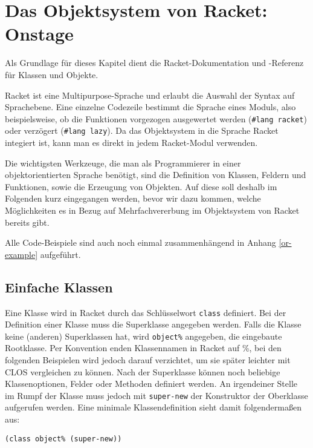 \section{Das Objektsystem von Racket: Onstage}
Als Grundlage für dieses Kapitel dient die Racket-Dokumentation\cite{racketguide-classes} und -Referenz\cite{racketref-classes} für Klassen und Objekte.

Racket ist eine Multipurpose-Sprache und erlaubt die Auswahl der Syntax auf Sprachebene. Eine einzelne Codezeile bestimmt die Sprache eines Moduls, also beispielsweise, ob die Funktionen vorgezogen ausgewertet werden (\texttt{\#lang racket}) oder verzögert (\texttt{\#lang lazy}). Da das Objektsystem in die Sprache Racket integiert ist, kann man es direkt in jedem Racket-Modul verwenden.


Die wichtigsten Werkzeuge, die man als Programmierer in einer objektorientierten Sprache benötigt, sind die Definition von Klassen, Feldern und Funktionen, sowie die Erzeugung von Objekten. Auf diese soll deshalb im Folgenden kurz eingegangen werden, bevor wir dazu kommen, welche Möglichkeiten es in Bezug auf Mehrfachvererbung im Objektsystem von Racket bereits gibt.

Alle Code-Beispiele sind auch noch einmal zusammenhängend in Anhang \ref{or-example} aufgeführt. 

\subsection{Einfache Klassen}

Eine Klasse wird in Racket durch das Schlüsselwort \texttt{class} definiert. Bei der Definition einer Klasse muss die Superklasse angegeben werden. Falls die Klasse keine (anderen) Superklassen hat, wird \texttt{object\%} angegeben, die eingebaute Rootklasse. Per Konvention enden Klassennamen in Racket auf \%, bei den folgenden Beispielen wird jedoch darauf verzichtet, um sie später leichter mit CLOS vergleichen zu können. Nach der Superklasse können noch beliebige Klassenoptionen, Felder oder Methoden definiert werden. An irgendeiner Stelle im Rumpf der Klasse muss jedoch mit \texttt{super-new} der Konstruktor der Oberklasse aufgerufen werden. Eine minimale Klassendefinition sieht damit folgendermaßen aus:

\begin{lstlisting}
(class object% (super-new))
\end{lstlisting}

